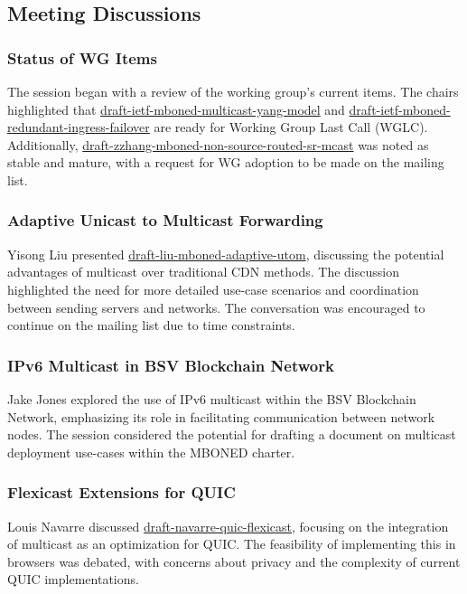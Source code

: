 \documentclass{article}
\begin{document}
\subsection{Meeting Discussions}

\subsubsection{Status of WG Items}
The session began with a review of the working group's current items. The chairs highlighted that \href{https://datatracker.ietf.org/doc/html/draft-ietf-mboned-multicast-yang-model}{draft-ietf-mboned-multicast-yang-model} and \href{https://datatracker.ietf.org/doc/html/draft-ietf-mboned-redundant-ingress-failover}{draft-ietf-mboned-redundant-ingress-failover} are ready for Working Group Last Call (WGLC). Additionally, \href{https://datatracker.ietf.org/doc/html/draft-zzhang-mboned-non-source-routed-sr-mcast}{draft-zzhang-mboned-non-source-routed-sr-mcast} was noted as stable and mature, with a request for WG adoption to be made on the mailing list.

\subsubsection{Adaptive Unicast to Multicast Forwarding}
Yisong Liu presented \href{https://datatracker.ietf.org/doc/html/draft-liu-mboned-adaptive-utom}{draft-liu-mboned-adaptive-utom}, discussing the potential advantages of multicast over traditional CDN methods. The discussion highlighted the need for more detailed use-case scenarios and coordination between sending servers and networks. The conversation was encouraged to continue on the mailing list due to time constraints.

\subsubsection{IPv6 Multicast in BSV Blockchain Network}
Jake Jones explored the use of IPv6 multicast within the BSV Blockchain Network, emphasizing its role in facilitating communication between network nodes. The session considered the potential for drafting a document on multicast deployment use-cases within the MBONED charter.

\subsubsection{Flexicast Extensions for QUIC}
Louis Navarre discussed \href{https://datatracker.ietf.org/doc/html/draft-navarre-quic-flexicast}{draft-navarre-quic-flexicast}, focusing on the integration of multicast as an optimization for QUIC. The feasibility of implementing this in browsers was debated, with concerns about privacy and the complexity of current QUIC implementations.
\end{document}
